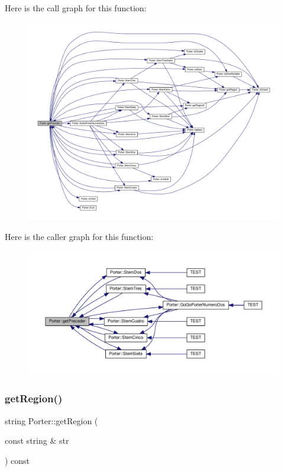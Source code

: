 Here is the call graph for this function\+:
\nopagebreak
\begin{figure}[H]
\begin{center}
\leavevmode
\includegraphics[width=350pt]{class_porter_a2000ce7eeabb3a7d9593fa9790a4fdc4_cgraph}
\end{center}
\end{figure}
Here is the caller graph for this function\+:
\nopagebreak
\begin{figure}[H]
\begin{center}
\leavevmode
\includegraphics[width=350pt]{class_porter_a2000ce7eeabb3a7d9593fa9790a4fdc4_icgraph}
\end{center}
\end{figure}
\mbox{\label{class_porter_a9e33d06b477f04db7c8cee07e85e8bcb}} 
\subsubsection{\texorpdfstring{get\+Region()}{getRegion()}}
{\footnotesize\ttfamily string Porter\+::get\+Region (\begin{DoxyParamCaption}\item[{const string \&}]{str }\end{DoxyParamCaption}) const}

